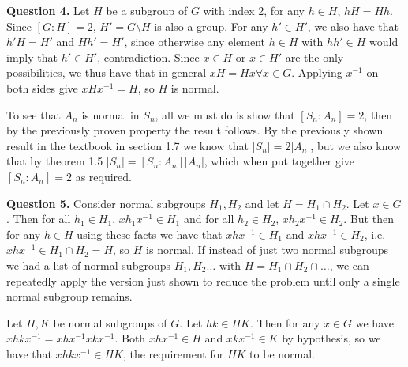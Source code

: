 \documentclass[letterpaper, reqno,11pt]{article}
\begin{document}
{\medskip\noindent\bf Question 4.} Let $H$ be a subgroup of $G$ with index 2, for any $h\in H$, $hH=Hh$. Since $[G:H]=2$, $H'=G\setminus H$ is also a group. For any $h'\in H'$, we also have that $h'H=H'$ and $Hh'=H'$, since otherwise any element $h\in H$ with $hh'\in H$ would imply that $h'\in H'$, contradiction. Since $x\in H$ or $x\in H'$ are the only possibilities, we thus have that in general $xH=Hx\forall x\in G$. Applying $x^{-1}$ on both sides give $xHx^{-1}=H$, so $H$ is normal.

To see that $A_n$ is normal in $S_n$, all we must do is show that $[S_n:A_n]=2$, then by the previously proven property the result follows. By the previously shown result in the textbook in section 1.7 we know that $|S_n|=2|A_n|$, but we also know that by theorem 1.5 $|S_n|=[S_n:A_n]|A_n|$, which when put together give $[S_n:A_n]=2$ as required.

{\medskip\noindent\bf Question 5.} Consider normal subgroups $H_1,H_2$ and let $H=H_1\cap H_2$. Let $x\in G$. Then for all $h_1\in H_1$, $xh_1x^{-1}\in H_1$ and for all $h_2\in H_2$, $xh_2x^{-1}\in H_2$. But then for any $h\in H$ using these facts we have that $xhx^{-1}\in H_1$ and $xhx^{-1}\in H_2$, i.e. $xhx^{-1}\in H_1\cap H_2=H$, so $H$ is normal. If instead of just two normal subgroups we had a list of normal subgroups $H_1,H_2\ldots$ with $H=H_1\cap H_2\cap \ldots$, we can repeatedly apply the version just shown to reduce the problem until only a single normal subgroup remains.

Let $H,K$ be normal subgroups of $G$. Let $hk\in HK$. Then for any $x\in G$ we have $xhkx^{-1}=xhx^{-1}xkx^{-1}$. Both $xhx^{-1}\in H$ and $xkx^{-1}\in K$ by hypothesis, so we have that $xhkx^{-1}\in HK$, the requirement for $HK$ to be normal.
\end{document}
